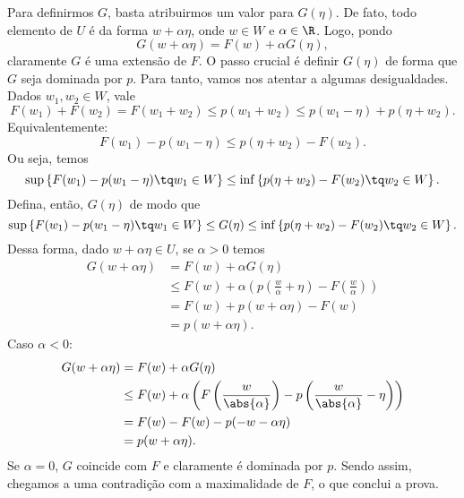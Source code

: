 Para definirmos \( G \), basta atribuirmos um valor para \( G(\eta) \).
De fato, todo elemento de \( U \) é da forma \( w + \alpha \eta \), onde \( w \in W \) e \( \alpha \in \R \).
Logo, pondo \[
    G(w + \alpha \eta) = F(w) + \alpha G(\eta)
,\]
claramente \( G \) é uma extensão de \( F \).
O passo crucial é definir \( G(\eta) \) de forma que \( G \) seja dominada por \( p \).
Para tanto, vamos nos atentar a algumas desigualdades.
Dados \( w_{ 1 }, w_{ 2 } \in W \), vale \[
    F(w_{ 1 }) + F(w_{ 2 }) =
    F(w_{ 1 } + w_{ 2 }) \leq
    p(w_{ 1 } + w_{ 2 }) \leq
    p(w_{ 1 } - \eta) + p(\eta + w_{ 2 })
.\]
Equivalentemente: \[
    F(w_{ 1 }) - p(w_{ 1 } - \eta) \leq p(\eta + w_{ 2 }) - F(w_{ 2 })
.\]
Ou seja, temos \[
    \sup \left\{ F(w_{ 1 }) - p(w_{ 1 } - \eta) \tq w_{ 1 } \in W \right\} \leq
    \inf \left\{ p(\eta + w_{ 2 }) - F(w_{ 2 }) \tq w_{ 2 } \in W \right\}
.\]
Defina, então, \( G(\eta) \) de modo que \[
    \sup \left\{ F(w_{ 1 }) - p(w_{ 1 } - \eta) \tq w_{ 1 } \in W \right\} \leq
    G(\eta) \leq
    \inf \left\{ p(\eta + w_{ 2 }) - F(w_{ 2 }) \tq w_{ 2 } \in W \right\}
.\]
Dessa forma, dado \( w + \alpha \eta \in U \), se \( \alpha > 0 \) temos
\begin{align*}
    G(w + \alpha \eta) &=
    F(w) + \alpha G(\eta) \\
    &\leq F(w) + \alpha \left( 
        p \left( \frac{ w }{ \alpha } + \eta \right) - F \left(  \frac{ w }{ \alpha }  \right)
    \right) \\
    &= F(w) + p(w + \alpha \eta) - F(w) \\
    &= p(w + \alpha \eta)
.\end{align*}
Caso \( \alpha < 0 \):
\begin{align*}
    G(w + \alpha \eta) &=
    F(w) + \alpha G(\eta) \\
    &\leq F(w) + \alpha \left( 
        F \left( \frac{ w }{ \abs{ \alpha } } \right) -
        p \left( \frac{ w }{ \abs{ \alpha } } - \eta \right)
    \right) \\
    &= F(w) - F(w) - p(-w - \alpha \eta) \\
    &= p(w + \alpha \eta)
.\end{align*}
Se \( \alpha = 0 \), \( G \) coincide com \( F \) e claramente é dominada por \( p \).
Sendo assim, chegamos a uma contradição com a maximalidade de \( F \), o que conclui a prova.